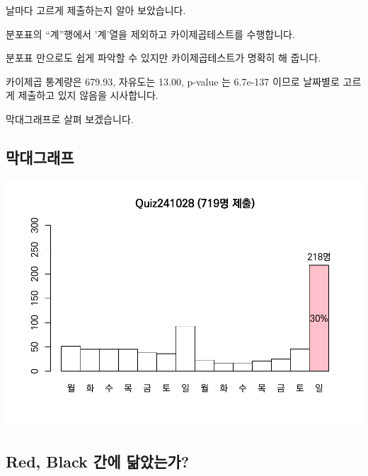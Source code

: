 \documentclass[
]{book}
\begin{document}
날마다 고르게 제출하는지 알아 보았습니다.

분포표의 ``계''행에서 '계'열을 제외하고 카이제곱테스트를 수행합니다.

분포표 만으로도 쉽게 파악할 수 있지만 카이제곱테스트가 명확히 해 줍니다.

카이제곱 통계량은 679.93, 자유도는 13.00, p-value 는 6.7e-137 이므로 날짜별로 고르게 제출하고 있지 않음을 시사합니다.

막대그래프로 살펴 보겠습니다.

\subsection{막대그래프}\label{uxb9c9uxb300uxadf8uxb798uxd504-10}

\includegraphics{Quiz_report_2025_files/figure-latex/unnamed-chunk-278-1.pdf}

\subsection{Red, Black 간에 닮았는가?}\label{red-black-uxac04uxc5d0-uxb2eeuxc558uxb294uxac00-8}
\end{document}
